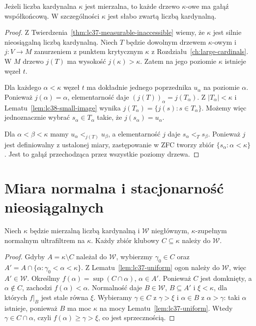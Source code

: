 \begin{twierdzenie}
\label{thm:lc38-measurable-tree}
Jeżeli liczba kardynalna $\kappa$ jest mierzalna,
to każde drzewo $\kappa$-owe
ma gałąź współkońcową.
W szczególności $\kappa$
jest słabo zwartą liczbą kardynalną.
\end{twierdzenie}
\begin{proof}
Z Twierdzenia~\ref{thm:lc37-measurable-inaccessible}
wiemy, że $\kappa$ jest
silnie nieosiągalną liczbą kardynalną.
Niech $T$ będzie dowolnym
drzewem $\kappa$-owym i
$j:V\to M$ zanurzeniem
z punktem krytycznym $\kappa$
z Rozdziału~\ref{ch:large-cardinals}.
W $M$ drzewo $j(T)$ ma
wysokość $j(\kappa)>\kappa$.
Zatem na jego poziomie
$\kappa$ istnieje węzeł $t$.

Dla każdego $\alpha<\kappa$
węzeł $t$ ma dokładnie
jednego poprzednika $u_\alpha$
na poziomie $\alpha$.
Ponieważ $j(\alpha)=\alpha$,
elementarność daje
$(j(T))_\alpha=j(T_\alpha)$.
Z $|T_\alpha|<\kappa$
i Lematu~\ref{lem:lc38-small-image}
wynika
$j(T_\alpha)=\{j(s):s\in T_\alpha\}$.
Możemy więc jednoznacznie
wybrać $s_\alpha\in T_\alpha$
takie, że $j(s_\alpha)=u_\alpha$.

Dla $\alpha<\beta<\kappa$
mamy $u_\alpha<_{j(T)}u_\beta$,
a elementarność $j$ daje
$s_\alpha<_{T}s_\beta$.
Ponieważ $j$ jest definiowalny
z ustalonej miary, zastępowanie
w ZFC tworzy zbiór
$\{s_\alpha:\alpha<\kappa\}$.
Jest to gałąź przechodząca
przez wszystkie poziomy drzewa.
\end{proof}

\section{Miara normalna i stacjonarność nieosiągalnych}

\begin{lemat}
\label{lem:lc38-clubs-in-measure}
Niech $\kappa$ będzie mierzalną liczbą kardynalną
i $\mathcal W$ niegłównym,
$\kappa$-zupełnym normalnym
ultrafiltrem na $\kappa$.
Każdy zbiór klubowy
$C\subseteq\kappa$ należy do
$\mathcal W$.
\end{lemat}
\begin{proof}
Gdyby $A=\kappa\setminus C$
należał do $\mathcal W$,
wybierzmy $\gamma_0\in C$
oraz $A'=A\cap\{\alpha:
\gamma_0<\alpha<\kappa\}$.
Z Lematu~\ref{lem:lc37-uniform}
ogon należy do $\mathcal W$,
więc $A'\in\mathcal W$.
Określmy
$f(\alpha)=\sup(C\cap\alpha)$,
$\alpha\in A'$.
Ponieważ $C$ jest domknięty,
a $\alpha\notin C$,
zachodzi $f(\alpha)<\alpha$.
Normalność daje
$B\in\mathcal W$, $B\subseteq A'$
i $\xi<\kappa$, dla których
$f|_B$ jest stale równa $\xi$.
Wybieramy $\gamma\in C$
z $\gamma>\xi$ i
$\alpha\in B$ z $\alpha>\gamma$:
taki $\alpha$ istnieje,
ponieważ $B$ ma moc $\kappa$
na mocy Lematu~\ref{lem:lc37-uniform}.
Wtedy $\gamma\in C\cap\alpha$,
czyli $f(\alpha)\ge\gamma>\xi$,
co jest sprzecznością.
\end{proof}

